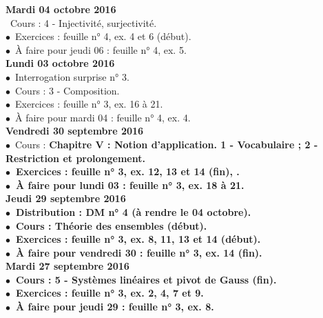 \documentclass[12pt,a4paper]{article}
\begin{document}
\noindent\textbf{\bf Mardi 04 octobre 2016 }\\
\bu\ Cours : 4 - Injectivité, surjectivité.\\
$\bullet$\ Exercices : feuille n° 4, ex. 4 et 6 (début).\\
$\bullet$\ À faire pour jeudi 06 : feuille n° 4, ex. 5.\vspace{.4cm}\\

\noindent\textbf{Lundi 03 octobre 2016 }\\
$\bullet$\ Interrogation surprise n° 3.\\
$\bullet$\ Cours : 3 - Composition.\\
$\bullet$\ Exercices : feuille n° 3, ex. 16 à 21.\\
$\bullet$\ À faire pour mardi 04 : feuille n° 4, ex. 4.\vspace{.4cm}\\
  
\noindent\textbf{Vendredi 30 septembre 2016 }\\
$\bullet$\ Cours : \bf Chapitre V \rm : Notion d'application. 1 - Vocabulaire ; 2 - Restriction et prolongement.\\
$\bullet$\ Exercices : feuille n° 3, ex. 12, 13 et 14 (fin), .\\
$\bullet$\ À faire pour lundi 03 : feuille n° 3, ex. 18 à 21.\vspace{.4cm}\\

\noindent\textbf{Jeudi 29 septembre 2016 }\\
$\bullet$\ Distribution : DM n° 4 (à rendre le 04 octobre).\\
$\bullet$\ Cours : Théorie des ensembles (début).\\
$\bullet$\ Exercices : feuille n° 3, ex. 8, 11, 13 et 14 (début).\\
$\bullet$\ À faire pour vendredi 30 : feuille n° 3, ex. 14 (fin).\vspace{.4cm}\\

\noindent\textbf{\bf Mardi 27 septembre 2016 }\\
$\bullet$\ Cours : 5 - Systèmes linéaires et pivot de Gauss (fin).\\
$\bullet$\ Exercices : feuille n° 3, ex. 2, 4, 7 et 9.\\
$\bullet$\ À faire pour jeudi 29 : feuille n° 3, ex. 8.\vspace{.4cm}\\
\end{document}
